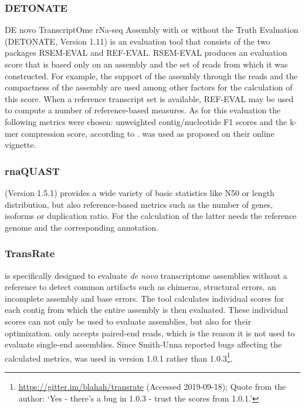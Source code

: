 \documentclass[12pt,a4paper,english]{article}
\begin{document}
\subsubsection*{DETONATE}
	DE novo TranscriptOme rNa-seq Assembly with or without the Truth Evaluation (DETONATE, Version 1.11) \citep{DETONATE:14} is an evaluation tool that consists of the two packages RSEM-EVAL and REF-EVAL.
	RSEM-EVAL produces an evaluation score that is based only on an assembly and the set of reads from which it was constructed.
	For example, the support of the assembly through the reads and the compactness of the assembly are used among other factors for the calculation of this score.
	When a reference transcript set is available, REF-EVAL may be used to compute a number of reference-based measures. As for this evaluation the following metrics were chosen: unweighted contig/nucleotide F1 scores and the k-mer compression score, according to \citet{hoelzer:19}.
	\detonate was used as proposed on their online vignette.

\subsubsection*{rnaQUAST}
	\rnaquast (Version 1.5.1) \citep{rnaQUAST:16} provides a wide variety of basic statistics like N50 or length distribution, but also reference-based metrics such as the number of genes, isoforms or duplication ratio. For the calculation of the latter \rnaquast needs the reference genome and the corresponding annotation.

\subsubsection*{TransRate}
	\transrate \citep{TransRate:16} is specifically designed to evaluate \textit{de novo} transcriptome assemblies without a reference to detect common artifacts such as chimeras, structural errors, an incomplete assembly and base errors. The tool calculates individual scores for each contig from which the entire assembly is then evaluated. These individual scores can not only be used to evaluate assemblies, but also for their optimization. \transrate only accepts paired-end reads, which is the reason it is not used to evaluate single-end assemblies.
	Since Smith-Unna reported bugs affecting the calculated metrics, \transrate was used in version 1.0.1 rather than 1.0.3\footnote{\href{https://gitter.im/blahah/transrate}{https://gitter.im/blahah/transrate} (Accessed 2019-09-18); Quote from the author: `Yes - there's a bug in 1.0.3 - trust the scores from 1.0.1.'}.
	
\end{document}
